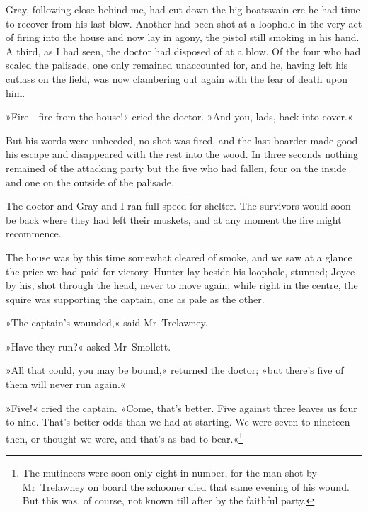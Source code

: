 Gray, following close behind me, had cut down the big boatswain ere he had time to recover from his last blow. Another had been shot at a loophole in the very act of firing into the house and now lay in agony, the pistol still smoking in his hand. A third, as I had seen, the doctor had disposed of at a blow. Of the four who had scaled the palisade, one only remained unaccounted for, and he, having left his cutlass on the field, was now clambering out again with the fear of death upon him.

»Fire—fire from the house!« cried the doctor. »And you, lads, back into cover.«

But his words were unheeded, no shot was fired, and the last boarder made good his escape and disappeared with the rest into the wood. In three seconds nothing remained of the attacking party but the five who had fallen, four on the inside and one on the outside of the palisade.

The doctor and Gray and I ran full speed for shelter. The survivors would soon be back where they had left their muskets, and at any moment the fire might recommence.

The house was by this time somewhat cleared of smoke, and we saw at a glance the price we had paid for victory. Hunter lay beside his loophole, stunned; Joyce by his, shot through the head, never to move again; while right in the centre, the squire was supporting the captain, one as pale as the other.

»The captain's wounded,« said Mr~Trelawney.

»Have they run?« asked Mr~Smollett.

»All that could, you may be bound,« returned the doctor; »but there's five of them will never run again.«

»Five!« cried the captain. »Come, that's better. Five against three leaves us four to nine. That's better odds than we had at starting. We were seven to nineteen then, or thought we were, and that's as bad to bear.«\footnote{The mutineers were soon only eight in number, for the man shot by Mr~Trelawney on board the schooner died that same evening of his wound. But this was, of course, not known till after by the faithful party.}
